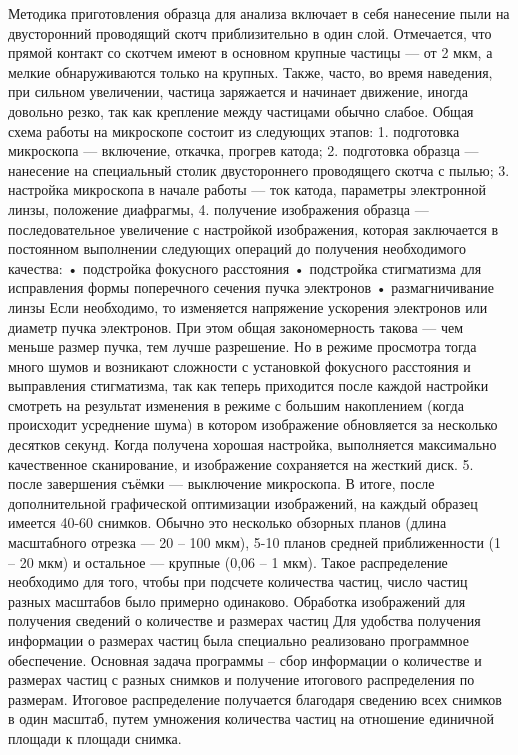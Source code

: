 Методика приготовления образца для анализа включает в себя нанесение пыли на двусторонний проводящий скотч приблизительно в один слой. Отмечается, что прямой контакт со скотчем имеют в основном крупные частицы — от 2 мкм, а мелкие обнаруживаются только на крупных. Также, часто, во время наведения, при сильном увеличении, частица заряжается и начинает движение, иногда довольно резко, так как крепление между частицами обычно слабое.
Общая схема работы на микроскопе состоит из следующих этапов: 
1.	подготовка микроскопа — включение, откачка, прогрев катода; 
2.	подготовка образца — нанесение на специальный столик двустороннего проводящего скотча с пылью; 
3.	настройка микроскопа в начале работы — ток катода, параметры электронной линзы, положение диафрагмы, 
4.	получение изображения образца — последовательное увеличение с настройкой изображения, которая заключается в постоянном выполнении следующих операций до получения необходимого качества:
•	подстройка фокусного расстояния 
•	подстройка стигматизма для исправления формы поперечного сечения пучка электронов
•	размагничивание линзы
Если необходимо, то изменяется напряжение ускорения электронов или диаметр пучка электронов. При этом общая закономерность такова — чем меньше размер пучка, тем лучше разрешение. Но в режиме просмотра тогда много шумов и возникают сложности с установкой фокусного расстояния и выправления стигматизма, так как теперь приходится после каждой настройки смотреть на результат изменения в режиме с большим накоплением (когда происходит усреднение шума) в котором изображение обновляется за несколько десятков секунд. Когда получена хорошая настройка, выполняется максимально качественное сканирование, и изображение сохраняется на жесткий диск.
5.	после завершения съёмки — выключение микроскопа.
В итоге, после дополнительной графической оптимизации изображений, на каждый образец имеется 40-60 снимков. Обычно это несколько обзорных планов (длина масштабного отрезка — 20 – 100 мкм), 5-10 планов средней приближенности (1 – 20 мкм) и остальное — крупные (0,06 – 1 мкм). Такое распределение необходимо для того, чтобы при подсчете количества частиц, число частиц разных масштабов было примерно одинаково.
Обработка изображений для получения сведений о количестве и размерах частиц
Для удобства получения информации о размерах частиц была специально реализовано программное обеспечение.
Основная задача программы – сбор информации о количестве и размерах частиц с разных снимков и получение итогового распределения по размерам. Итоговое распределение получается благодаря сведению всех снимков в один масштаб, путем умножения количества частиц на отношение единичной площади к площади снимка.

